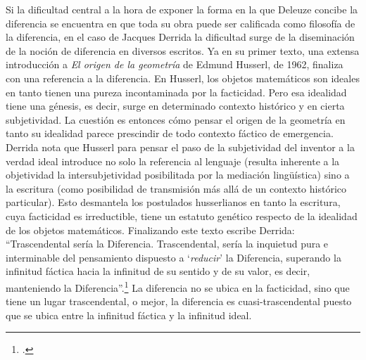 Si la dificultad central a la hora de exponer la forma en la que Deleuze
concibe la diferencia se encuentra en que toda su obra puede ser
calificada como filosofía de la diferencia, en el caso de Jacques
Derrida la dificultad surge de la diseminación de la noción de
diferencia en diversos escritos. Ya en su primer texto, una extensa
introducción a \emph{El origen de la geometría} de Edmund Husserl, de
1962, finaliza con una referencia a la diferencia. En Husserl, los
objetos matemáticos son ideales en tanto tienen una pureza incontaminada
por la facticidad. Pero esa idealidad tiene una génesis, es decir, surge
en determinado contexto histórico y en cierta subjetividad. La cuestión
es entonces cómo pensar el origen de la geometría en tanto su idealidad
parece prescindir de todo contexto fáctico de emergencia. Derrida nota
que Husserl para pensar el paso de la subjetividad del inventor a la
verdad ideal introduce no solo la referencia al lenguaje (resulta
inherente a la objetividad la intersubjetividad posibilitada por la
mediación lingüística) sino a la escritura (como posibilidad de
transmisión más allá de un contexto histórico particular). Esto
desmantela los postulados husserlianos en tanto la escritura, cuya
facticidad es irreductible, tiene un estatuto genético respecto de la
idealidad de los objetos matemáticos. Finalizando este texto escribe
Derrida: \enquote{Trascendental sería la Diferencia. Trascendental, sería la
inquietud pura e interminable del pensamiento dispuesto a
\enquote{\emph{reducir}} la Diferencia, superando la infinitud fáctica hacia
la infinitud de su sentido y de su valor, es decir, manteniendo la
Diferencia}.\footcite[162]{derrida2000} La diferencia no se ubica en la facticidad, sino que
tiene un lugar trascendental, o mejor, la diferencia es
cuasi-trascendental puesto que se ubica entre la infinitud fáctica y la
infinitud ideal.

